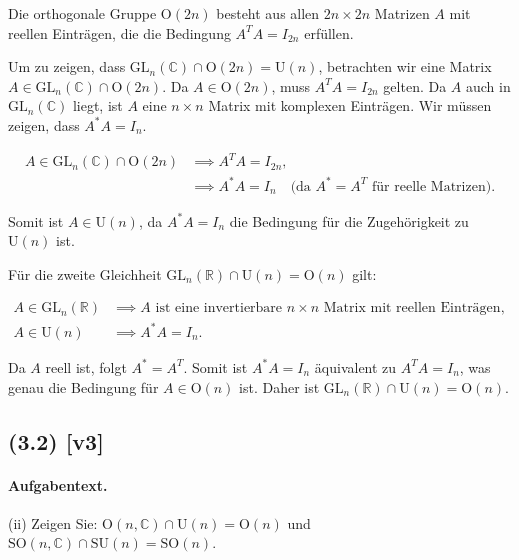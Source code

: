 \documentclass[11pt,a4paper]{article}
\begin{document}
Die orthogonale Gruppe $\mathrm{O}(2n)$ besteht aus allen $2n \times 2n$ Matrizen $A$ mit reellen Einträgen, die die Bedingung $A^T A = I_{2n}$ erfüllen.

Um zu zeigen, dass $\mathrm{GL}_n(\mathbb{C}) \cap \mathrm{O}(2n) = \mathrm{U}(n)$, betrachten wir eine Matrix $A \in \mathrm{GL}_n(\mathbb{C}) \cap \mathrm{O}(2n)$. Da $A \in \mathrm{O}(2n)$, muss $A^T A = I_{2n}$ gelten. Da $A$ auch in $\mathrm{GL}_n(\mathbb{C})$ liegt, ist $A$ eine $n \times n$ Matrix mit komplexen Einträgen. Wir müssen zeigen, dass $A^* A = I_n$.

\begin{align*}
A \in \mathrm{GL}_n(\mathbb{C}) \cap \mathrm{O}(2n) &\implies A^T A = I_{2n}, \\
&\implies A^* A = I_n \quad \text{(da $A^* = A^T$ für reelle Matrizen)}.
\end{align*}

Somit ist $A \in \mathrm{U}(n)$, da $A^* A = I_n$ die Bedingung für die Zugehörigkeit zu $\mathrm{U}(n)$ ist.

Für die zweite Gleichheit $\mathrm{GL}_n(\mathbb{R}) \cap \mathrm{U}(n) = \mathrm{O}(n)$ gilt:

\begin{align*}
A \in \mathrm{GL}_n(\mathbb{R}) &\implies A \text{ ist eine invertierbare } n \times n \text{ Matrix mit reellen Einträgen}, \\
A \in \mathrm{U}(n) &\implies A^* A = I_n.
\end{align*}

Da $A$ reell ist, folgt $A^* = A^T$. Somit ist $A^* A = I_n$ äquivalent zu $A^T A = I_n$, was genau die Bedingung für $A \in \mathrm{O}(n)$ ist. Daher ist $\mathrm{GL}_n(\mathbb{R}) \cap \mathrm{U}(n) = \mathrm{O}(n)$.


\subsection*{(3.2) [v3]}
\paragraph{Aufgabentext.}
(ii)  Zeigen Sie: $\mathrm{O}(n, \mathbb{C}) \cap \mathrm{U}(n)=\mathrm{O}(n)$ und $\mathrm{SO}(n, \mathbb{C}) \cap \mathrm{SU}(n)=\mathrm{SO}(n)$.
\end{document}
